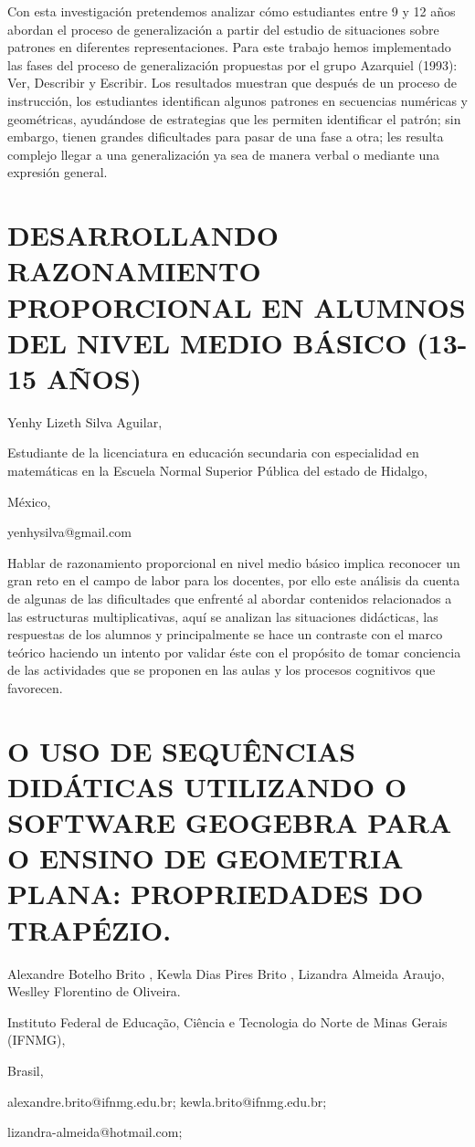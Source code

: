 Con esta investigación pretendemos analizar cómo estudiantes entre
9 y 12 años abordan el proceso de generalización a partir del estudio
de situaciones sobre patrones en diferentes representaciones. Para
este trabajo hemos implementado las fases del proceso de generalización
propuestas por el grupo Azarquiel (1993): Ver, Describir y Escribir.
Los resultados muestran que después de un proceso de instrucción,
los estudiantes identifican algunos patrones en secuencias numéricas
y geométricas, ayudándose de estrategias que les permiten identificar
el patrón; sin embargo, tienen grandes dificultades para pasar de
una fase a otra; les resulta complejo llegar a una generalización
ya sea de manera verbal o mediante una expresión general.


\section{DESARROLLANDO RAZONAMIENTO PROPORCIONAL EN ALUMNOS DEL NIVEL MEDIO
BÁSICO (13-15 AÑOS) }

\begin{datos}

Yenhy Lizeth Silva Aguilar,

Estudiante de la licenciatura en educación secundaria con especialidad
en matemáticas en la Escuela Normal Superior Pública del estado de
Hidalgo,

México,

yenhysilva@gmail.com

\end{datos}

Hablar de razonamiento proporcional en nivel medio básico implica
reconocer un gran reto en el campo de labor para los docentes, por
ello este análisis da cuenta de algunas de las dificultades que enfrenté
al abordar contenidos relacionados a las estructuras multiplicativas,
aquí se analizan las situaciones didácticas, las respuestas de los
alumnos y principalmente se hace un contraste con el marco teórico
haciendo un intento por validar éste con el propósito de tomar conciencia
de las actividades que se proponen en las aulas y los procesos cognitivos
que favorecen.


\section{O USO DE SEQUÊNCIAS DIDÁTICAS UTILIZANDO O SOFTWARE GEOGEBRA PARA
O ENSINO DE GEOMETRIA PLANA: PROPRIEDADES DO TRAPÉZIO.}

\begin{datos}

Alexandre Botelho Brito , Kewla Dias Pires Brito , Lizandra Almeida
Araujo, Weslley Florentino de Oliveira.

Instituto Federal de Educação, Ciência e Tecnologia do Norte de Minas
Gerais (IFNMG),

Brasil, 

alexandre.brito@ifnmg.edu.br; kewla.brito@ifnmg.edu.br; 

lizandra-almeida@hotmail.com;

\end{datos}


